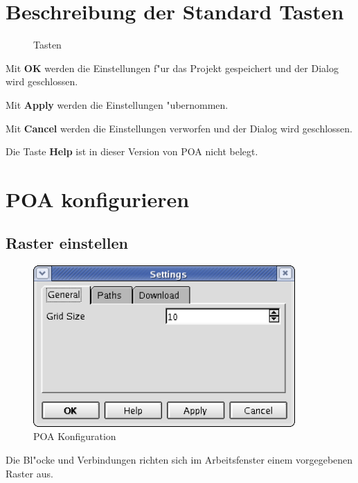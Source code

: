 \documentclass[a4paper,titlepage,12pt,ngerman]{scrbook}
\begin{document}
\section{Beschreibung der Standard Tasten}
\begin{figure}[htbp]

\begin{center}


\caption{Tasten}\label{test}

\end{center}

\end{figure}
Mit {\bf OK} werden die Einstellungen f"ur das Projekt gespeichert und der Dialog wird geschlossen.\par
Mit {\bf Apply} werden die Einstellungen "ubernommen.\par
Mit {\bf Cancel} werden die Einstellungen verworfen und der Dialog wird geschlossen.\par
Die Taste {\bf Help} ist in dieser Version von POA nicht belegt.


\section{POA konfigurieren}

\subsection{Raster einstellen}
\begin{figure}[htbp]

\begin{center}

\includegraphics[width=10cm]{POAConfiguration1}

\caption{POA Konfiguration}\label{test}

\end{center}

\end{figure}
Die Bl"ocke und Verbindungen richten sich im Arbeitsfenster einem vorgegebenen Raster aus.\par
\end{document}
